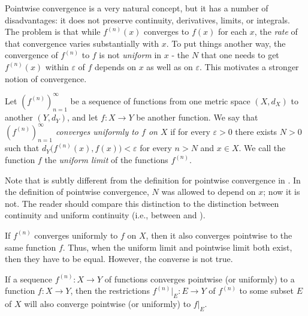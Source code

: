 \begin{note}
  Pointwise convergence is a very natural concept, but it has a number of disadvantages:
  it does not preserve continuity, derivatives, limits, or integrals.
  The problem is that while \(f^{(n)}(x)\) converges to \(f(x)\) for each \(x\), the \emph{rate} of that convergence varies substantially with \(x\).
  To put things another way, the convergence of \(f^{(n)}\) to \(f\) is not \emph{uniform} in \(x\)
  - the \(N\) that one needs to get \(f^{(n)}(x)\) within \(\varepsilon\) of \(f\) depends on \(x\) as well as on \(\varepsilon\).
  This motivates a stronger notion of convergence.
\end{note}

\setcounter{thm}{6}
\begin{defn}\label{ii:3.2.7}
  Let \((f^{(n)})_{n = 1}^\infty\) be a sequence of functions from one metric space \((X, d_X)\) to another \((Y, d_Y)\), and let \(f : X \to Y\) be another function.
  We say that \emph{\((f^{(n)})_{n = 1}^\infty\) converges uniformly to \(f\) on \(X\)} if for every \(\varepsilon > 0\) there exists \(N > 0\) such that \(d_Y\big(f^{(n)}(x), f(x)\big) < \varepsilon\) for every \(n > N\) and \(x \in X\).
  We call the function \(f\) the \emph{uniform limit} of the functions \(f^{(n)}\).
\end{defn}

\begin{rmk}\label{ii:3.2.8}
  Note that  is subtly different from the definition for pointwise convergence in .
  In the definition of pointwise convergence, \(N\) was allowed to depend on \(x\);
  now it is not.
  The reader should compare this distinction to the distinction between continuity and uniform continuity
  (i.e., between  and ).
\end{rmk}

\begin{note}
  If \(f^{(n)}\) converges uniformly to \(f\) on \(X\), then it also converges pointwise to the same function \(f\).
  Thus, when the uniform limit and pointwise limit both exist, then they have to be equal.
  However, the converse is not true.
\end{note}

\begin{note}
  If a sequence \(f^{(n)} : X \to Y\) of functions converges pointwise (or uniformly) to a function \(f : X \to Y\), then the restrictions \(f^{(n)}|_E : E \to Y\) of \(f^{(n)}\) to some subset \(E\) of \(X\) will also converge pointwise (or uniformly) to \(f|_E\).
\end{note}

